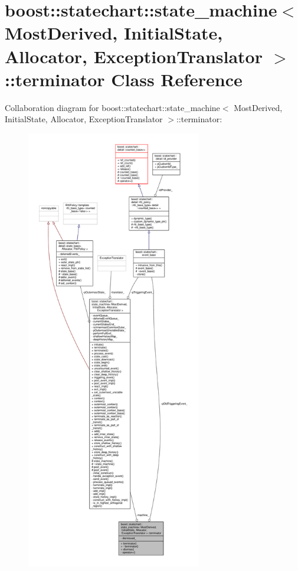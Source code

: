 \hypertarget{classboost_1_1statechart_1_1state__machine_1_1terminator}{}\section{boost\+:\+:statechart\+:\+:state\+\_\+machine$<$ Most\+Derived, Initial\+State, Allocator, Exception\+Translator $>$\+:\+:terminator Class Reference}
\label{classboost_1_1statechart_1_1state__machine_1_1terminator}


Collaboration diagram for boost\+:\+:statechart\+:\+:state\+\_\+machine$<$ Most\+Derived, Initial\+State, Allocator, Exception\+Translator $>$\+:\+:terminator\+:
\nopagebreak
\begin{figure}[H]
\begin{center}
\leavevmode
\includegraphics[height=550pt]{classboost_1_1statechart_1_1state__machine_1_1terminator__coll__graph}
\end{center}
\end{figure}
